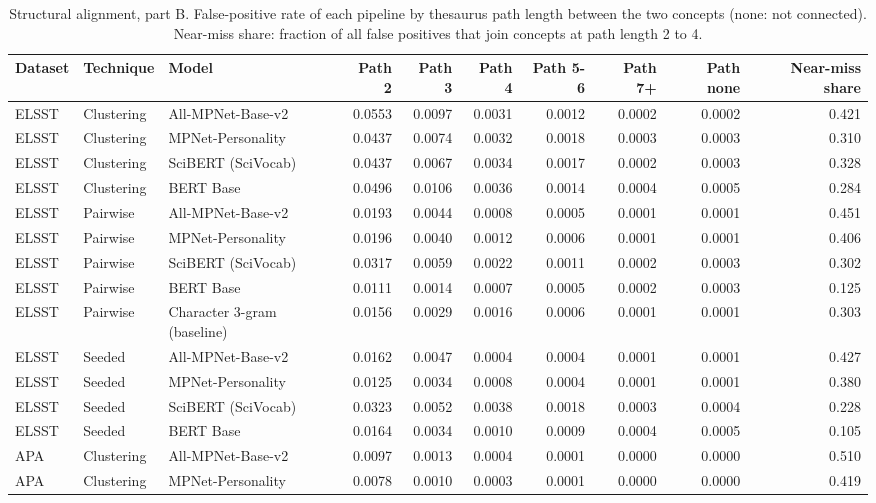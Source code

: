 \begin{table}[ht]
\centering
\small
\caption{Structural alignment, part B. False-positive rate of each pipeline by thesaurus path length between the two concepts (none: not connected). Near-miss share: fraction of all false positives that join concepts at path length 2 to 4.}
\label{tab:table6b_structural_false_merges}
\begin{tabular}{lllrrrrrrr}
\toprule
Dataset & Technique & Model & Path 2 & Path 3 & Path 4 & Path 5-6 & Path 7+ & Path none & Near-miss share \\
\midrule
ELSST & Clustering & All-MPNet-Base-v2 & 0.0553 & 0.0097 & 0.0031 & 0.0012 & 0.0002 & 0.0002 & 0.421 \\
ELSST & Clustering & MPNet-Personality & 0.0437 & 0.0074 & 0.0032 & 0.0018 & 0.0003 & 0.0003 & 0.310 \\
ELSST & Clustering & SciBERT (SciVocab) & 0.0437 & 0.0067 & 0.0034 & 0.0017 & 0.0002 & 0.0003 & 0.328 \\
ELSST & Clustering & BERT Base & 0.0496 & 0.0106 & 0.0036 & 0.0014 & 0.0004 & 0.0005 & 0.284 \\
ELSST & Pairwise & All-MPNet-Base-v2 & 0.0193 & 0.0044 & 0.0008 & 0.0005 & 0.0001 & 0.0001 & 0.451 \\
ELSST & Pairwise & MPNet-Personality & 0.0196 & 0.0040 & 0.0012 & 0.0006 & 0.0001 & 0.0001 & 0.406 \\
ELSST & Pairwise & SciBERT (SciVocab) & 0.0317 & 0.0059 & 0.0022 & 0.0011 & 0.0002 & 0.0003 & 0.302 \\
ELSST & Pairwise & BERT Base & 0.0111 & 0.0014 & 0.0007 & 0.0005 & 0.0002 & 0.0003 & 0.125 \\
ELSST & Pairwise & Character 3-gram (baseline) & 0.0156 & 0.0029 & 0.0016 & 0.0006 & 0.0001 & 0.0001 & 0.303 \\
ELSST & Seeded & All-MPNet-Base-v2 & 0.0162 & 0.0047 & 0.0004 & 0.0004 & 0.0001 & 0.0001 & 0.427 \\
ELSST & Seeded & MPNet-Personality & 0.0125 & 0.0034 & 0.0008 & 0.0004 & 0.0001 & 0.0001 & 0.380 \\
ELSST & Seeded & SciBERT (SciVocab) & 0.0323 & 0.0052 & 0.0038 & 0.0018 & 0.0003 & 0.0004 & 0.228 \\
ELSST & Seeded & BERT Base & 0.0164 & 0.0034 & 0.0010 & 0.0009 & 0.0004 & 0.0005 & 0.105 \\
APA & Clustering & All-MPNet-Base-v2 & 0.0097 & 0.0013 & 0.0004 & 0.0001 & 0.0000 & 0.0000 & 0.510 \\
APA & Clustering & MPNet-Personality & 0.0078 & 0.0010 & 0.0003 & 0.0001 & 0.0000 & 0.0000 & 0.419 \\

\end{tabular}
\end{table}

